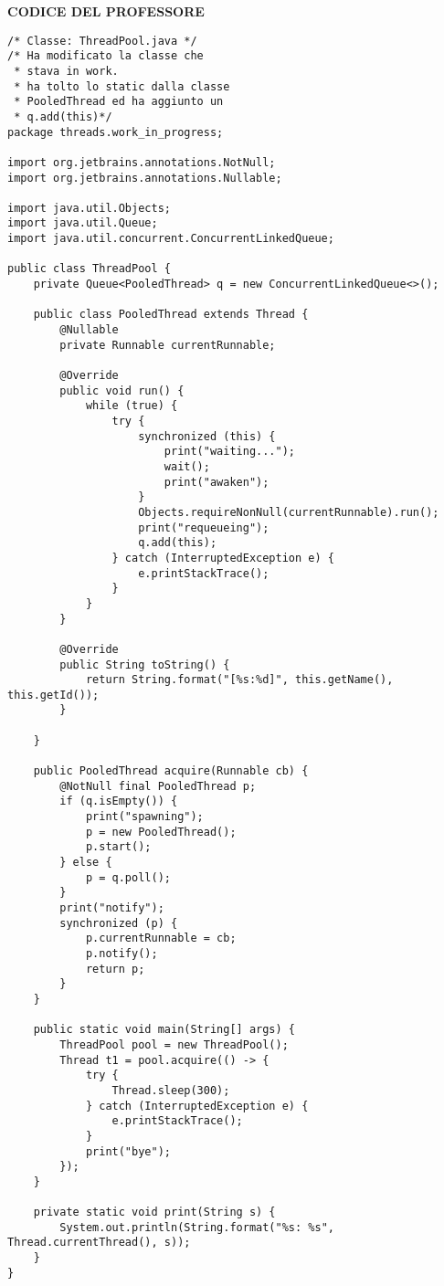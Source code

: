 \noindent \textbf{CODICE DEL PROFESSORE} \newline
\begin{lstlisting}
/* Classe: ThreadPool.java */
/* Ha modificato la classe che
 * stava in work.
 * ha tolto lo static dalla classe
 * PooledThread ed ha aggiunto un 
 * q.add(this)*/
package threads.work_in_progress;

import org.jetbrains.annotations.NotNull;
import org.jetbrains.annotations.Nullable;

import java.util.Objects;
import java.util.Queue;
import java.util.concurrent.ConcurrentLinkedQueue;

public class ThreadPool {
    private Queue<PooledThread> q = new ConcurrentLinkedQueue<>();

    public class PooledThread extends Thread {
        @Nullable
        private Runnable currentRunnable;

        @Override
        public void run() {
            while (true) {
                try {
                    synchronized (this) {
                        print("waiting...");
                        wait();
                        print("awaken");
                    }
                    Objects.requireNonNull(currentRunnable).run();
                    print("requeueing");
                    q.add(this);
                } catch (InterruptedException e) {
                    e.printStackTrace();
                }
            }
        }

        @Override
        public String toString() {
            return String.format("[%s:%d]", this.getName(), this.getId());
        }

    }

    public PooledThread acquire(Runnable cb) {
        @NotNull final PooledThread p;
        if (q.isEmpty()) {
            print("spawning");
            p = new PooledThread();
            p.start();
        } else {
            p = q.poll();
        }
        print("notify");
        synchronized (p) {
            p.currentRunnable = cb;
            p.notify();
            return p;
        }
    }

    public static void main(String[] args) {
        ThreadPool pool = new ThreadPool();
        Thread t1 = pool.acquire(() -> {
            try {
                Thread.sleep(300);
            } catch (InterruptedException e) {
                e.printStackTrace();
            }
            print("bye");
        });
    }

    private static void print(String s) {
        System.out.println(String.format("%s: %s", Thread.currentThread(), s));
    }
}

\end{lstlisting}
 


